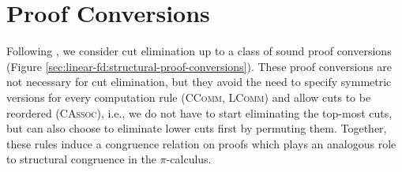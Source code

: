 \section{Proof Conversions}
Following \citet{Caires2010:ILLasSessions,Wadler2012:PropositionsAsSessions},
we consider cut elimination up to a class of
sound proof conversions (Figure \ref{sec:linear-fd:structural-proof-conversions}).
These proof conversions are not necessary for cut elimination,
but they avoid the need to specify symmetric versions for every computation rule (\textsc{CComm}, \textsc{LComm})
and allow cuts to be reordered (\textsc{CAssoc}), i.e., we do not have to start eliminating
the top-most cuts, but can also choose to eliminate lower cuts first by permuting them.
Together, these rules induce a congruence relation on proofs which plays
an analogous role to structural congruence in the $\pi$-calculus.

